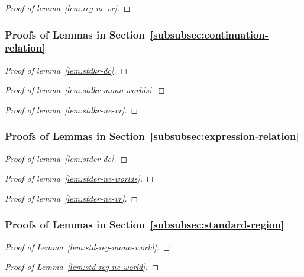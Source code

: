 \documentclass{article}
\begin{document}
\begin{appendices}
\begin{proof}[Proof of lemma~\ref{lem:reg-ne-vr}]
\end{proof}

\subsubsection{Proofs of Lemmas in Section~\ref{subsubsec:continuation-relation}}
\begin{proof}[Proof of lemma~\ref{lem:stdkr-dc}]
\end{proof}

\begin{proof}[Proof of lemma~\ref{lem:stdkr-mono-worlds}]
\end{proof}

\begin{proof}[Proof of lemma~\ref{lem:stdkr-ne-vr}]
\end{proof}

\subsubsection{Proofs of Lemmas in Section~\ref{subsubsec:expression-relation}}
\begin{proof}[Proof of lemma~\ref{lem:stder-dc}]
\end{proof}

\begin{proof}[Proof of lemma~\ref{lem:stder-ne-worlds}]
\end{proof}

\begin{proof}[Proof of lemma~\ref{lem:stder-ne-vr}]
\end{proof}

\subsubsection{Proofs of Lemmas in Section~\ref{subsubsec:standard-region}}
\begin{proof}[Proof of Lemma~\ref{lem:std-reg-mono-world}]
\end{proof}

\begin{proof}[Proof of Lemma~\ref{lem:std-reg-ne-world}]
\end{proof}


\end{appendices}
\end{document}
